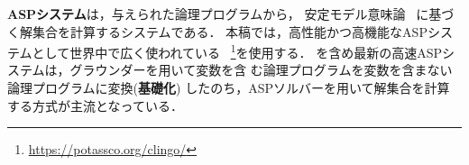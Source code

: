\textbf{ASPシステム}は，与えられた論理プログラムから，
安定モデル意味論~\cite{Gelfond88:iclp}
に基づく解集合を計算するシステムである．
本稿では，高性能かつ高機能なASPシステムとして世界中で広く使われている
{\clingo}~\footnote{\url{https://potassco.org/clingo/}}を使用する．
{\clingo}を含め最新の高速ASPシステムは，グラウンダーを用いて変数を含
む論理プログラムを変数を含まない論理プログラムに変換(\textbf{基礎化})
したのち，ASPソルバーを用いて解集合を計算する方式が主流となっている．

%




